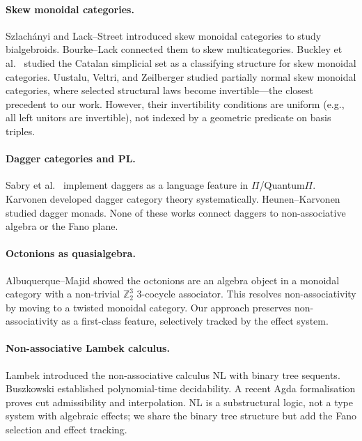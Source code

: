\documentclass[11pt,a4paper]{article}
\theoremstyle{definition}
\theoremstyle{remark}
\newcommand{\ZZ}{\mathbb{Z}}
\begin{document}
\paragraph{Skew monoidal categories.}
Szlach\'{a}nyi \cite{szlachanyi2012} and Lack--Street
\cite{lackstreet2012} introduced skew monoidal categories to study
bialgebroids. Bourke--Lack \cite{bourke2018} connected them to
skew multicategories. Buckley et al.\ \cite{buckley2014} studied the Catalan simplicial set
as a classifying structure for skew monoidal categories.
Uustalu, Veltri, and Zeilberger \cite{uvz2021} studied partially
normal skew monoidal categories, where selected structural laws become
invertible---the closest precedent to our work. However, their
invertibility conditions are uniform (e.g., all left unitors are
invertible), not indexed by a geometric predicate on basis triples.

\paragraph{Dagger categories and PL.}
Sabry et al.\ \cite{sabry2024quantumpi} implement daggers as a
language feature in $\Pi$/Quantum$\Pi$. Karvonen \cite{karvonen2019}
developed dagger category theory systematically. Heunen--Karvonen
\cite{heunen2016} studied dagger monads. None of these works connect
daggers to non-associative algebra or the Fano plane.

\paragraph{Octonions as quasialgebra.}
Albuquerque--Majid \cite{albuquerque1999} showed the octonions are an
algebra object in a monoidal category with a non-trivial $\ZZ_2^3$
3-cocycle associator. This resolves non-associativity by moving to a
twisted monoidal category. Our approach preserves non-associativity as
a first-class feature, selectively tracked by the effect system.

\paragraph{Non-associative Lambek calculus.}
Lambek \cite{lambek1961} introduced the non-associative calculus NL
with binary tree sequents. Buszkowski established polynomial-time
decidability. A recent Agda formalisation \cite{agdanl2025} proves cut
admissibility and interpolation. NL is a substructural logic, not a
type system with algebraic effects; we share the binary tree structure
but add the Fano selection and effect tracking.
\end{document}
